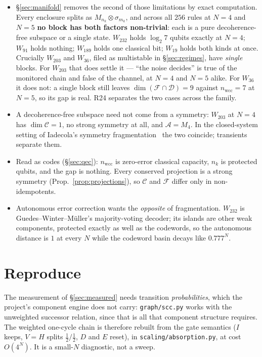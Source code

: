 \documentclass[11pt]{article}
\newcommand{\fn}[1]{\texttt{#1}}
\theoremstyle{plain}
\theoremstyle{definition}
\theoremstyle{remark}
\begin{document}
\begin{itemize}
for it.
\item \S\ref{sec:manifold} removes the second of those limitations by exact
computation. Every enclosure splits as $M_{n_k}\otimes\sigma_{m_k}$, and across
all $256$ rules at $N=4$ and $N=5$ \textbf{no block has both factors
non-trivial}: each is a pure decoherence-free subspace or a single state.
$W_{232}$ holds $\log_2 7$ qubits exactly at $N=4$; $W_{91}$ holds nothing;
$W_{189}$ holds one classical bit; $W_{19}$ holds both kinds at once. Crucially
$W_{203}$ and $W_{36}$, filed as multistable in \S\ref{sec:regimes}, have
\emph{single} blocks. For $W_{203}$ that does settle it --- ``the noise
decides'' is true of the monitored chain and false of the channel, at $N=4$ and
$N=5$ alike. For $W_{36}$ it does not: a single block still leaves
$\dim(\mathcal{F}\cap\mathcal{D}) = 9$ against $n_{\mathrm{wcc}} = 7$ at $N=5$,
so its gap is real. R24 separates the two cases across the family.
\item A decoherence-free subspace need not come from a symmetry: $W_{203}$ at
$N=4$ has $\dim\mathcal{C}=1$, no strong symmetry at all, and
$\mathcal{A} = M_4$. In the closed-system setting of Iadecola's symmetry
fragmentation~\cite{iadecola2026} the two coincide; transients separate them.
\item Read as codes (\S\ref{sec:qec}): $n_{\mathrm{wcc}}$ is zero-error
classical capacity, $n_k$ is protected qubits, and the gap is nothing. Every
conserved projection is a strong symmetry
(Prop.~\ref{prop:projections}), so $\mathcal{C}$ and $\mathcal{F}$ differ only
in non-idempotents.
\item Autonomous error correction wants the \emph{opposite} of fragmentation.
$W_{232}$ is Guedes--Winter--M\"uller's majority-voting decoder; its islands
are other weak components, protected exactly as well as the codewords, so the
autonomous distance is $1$ at every $N$ while the codeword basin decays like
$0.777^N$.
\end{itemize}

\section*{Reproduce}

The measurement of \S\ref{sec:measured} needs transition \emph{probabilities},
which the project's component engine does not carry: \fn{graph/scc.py} works
with the unweighted successor relation, since that is all that component
structure requires. The weighted one-cycle chain is therefore rebuilt from the
gate semantics ($I$ keeps, $V=H$ splits $\tfrac12/\tfrac12$, $D$ and $E$
reset), in \fn{scaling/absorption.py}, at cost $O(4^N)$. It is a small-$N$
diagnostic, not a sweep.
\end{document}
